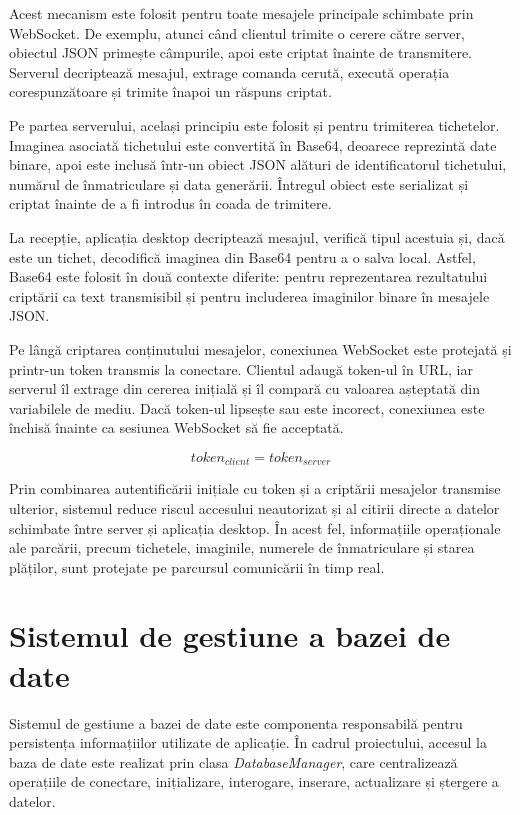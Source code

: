 Acest mecanism este folosit pentru toate mesajele principale schimbate prin WebSocket. De exemplu, atunci când clientul trimite o cerere către server, obiectul JSON primește câmpurile, apoi este criptat înainte de transmitere. Serverul decriptează mesajul, extrage comanda cerută, execută operația corespunzătoare și trimite înapoi un răspuns criptat.

Pe partea serverului, același principiu este folosit și pentru trimiterea tichetelor. Imaginea asociată tichetului este convertită în Base64, deoarece reprezintă date binare, apoi este inclusă într-un obiect JSON alături de identificatorul tichetului, numărul de înmatriculare și data generării. Întregul obiect este serializat și criptat înainte de a fi introdus în coada de trimitere.

La recepție, aplicația desktop decriptează mesajul, verifică tipul acestuia și, dacă este un tichet, decodifică imaginea din Base64 pentru a o salva local. Astfel, Base64 este folosit în două contexte diferite: pentru reprezentarea rezultatului criptării ca text transmisibil și pentru includerea imaginilor binare în mesajele JSON.

Pe lângă criptarea conținutului mesajelor, conexiunea WebSocket este protejată și printr-un token transmis la conectare. Clientul adaugă token-ul în URL, iar serverul îl extrage din cererea inițială și îl compară cu valoarea așteptată din variabilele de mediu. Dacă token-ul lipsește sau este incorect, conexiunea este închisă înainte ca sesiunea WebSocket să fie acceptată.

\[
    token_{client} = token_{server}
\]

Prin combinarea autentificării inițiale cu token și a criptării mesajelor transmise ulterior, sistemul reduce riscul accesului neautorizat și al citirii directe a datelor schimbate între server și aplicația desktop. În acest fel, informațiile operaționale ale parcării, precum tichetele, imaginile, numerele de înmatriculare și starea plăților, sunt protejate pe parcursul comunicării în timp real.

\section{Sistemul de gestiune a bazei de date}

Sistemul de gestiune a bazei de date este componenta responsabilă pentru persistența informațiilor utilizate de aplicație. În cadrul proiectului, accesul la baza de date este realizat prin clasa \textit{DatabaseManager}, care centralizează operațiile de conectare, inițializare, interogare, inserare, actualizare și ștergere a datelor.

